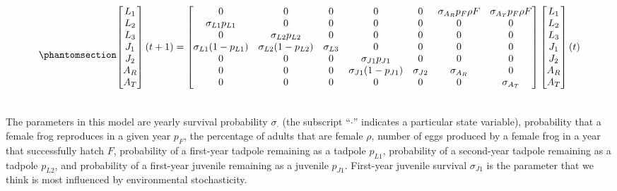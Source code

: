 \documentclass[
  letterpaper,
  DIV=11,
  numbers=noendperiod]{scrartcl}
\begin{document}
\begin{equation}\phantomsection\label{eq-matrix}{
\begin{aligned}
\begin{bmatrix}
L_1 \\
L_2 \\
L_3 \\
J_1 \\
J_2 \\
A_R \\ 
A_T
\end{bmatrix}(t + 1) = 
\begin{bmatrix}
  0 & 0 & 0 & 0 & 0 & \sigma_{A_R} p_F \rho F & \sigma_{A_T} p_F \rho F \\
  \sigma_{L1} p_{L1} & 0 & 0 & 0 & 0 & 0 & 0 \\
  0 & \sigma_{L2} p_{L2} & 0 & 0 & 0 & 0 & 0\\
  \sigma_{L1} (1 - p_{L1}) & \sigma_{L2} (1 - p_{L2}) & \sigma_{L3} & 0 & 0 & 0 & 0 \\
  0 & 0 & 0 & \sigma_{J1} p_{J1} & 0 & 0 & 0 \\
  0 & 0 & 0 & \sigma_{J1} (1 - p_{J1}) & \sigma_{J2}  & \sigma_{A_R} & 0 \\
  0 & 0 & 0 & 0 & 0 & 0 & \sigma_{A_T} 
\end{bmatrix} \begin{bmatrix}
L_1 \\
L_2 \\
L_3 \\
J_1 \\
J_2 \\
A_R \\
A_T \\
\end{bmatrix}(t) \\
\hspace{0.0001cm}
\end{aligned}
}\end{equation}

The parameters in this model are yearly survival probability
\(\sigma_{\cdot}\) (the subscript ``\(\cdot\)'' indicates a particular
state variable), probability that a female frog reproduces in a given
year \(p_F\), the percentage of adults that are female \(\rho\), number
of eggs produced by a female frog in a year that successfully hatch
\(F\), probability of a first-year tadpole remaining as a tadpole
\(p_{L1}\), probability of a second-year tadpole remaining as a tadpole
\(p_{L2}\), and probability of a first-year juvenile remaining as a
juvenile \(p_{J1}\). First-year juvenile survival \(\sigma_{J1}\) is the
parameter that we think is most influenced by environmental
stochasticity.
\end{document}

